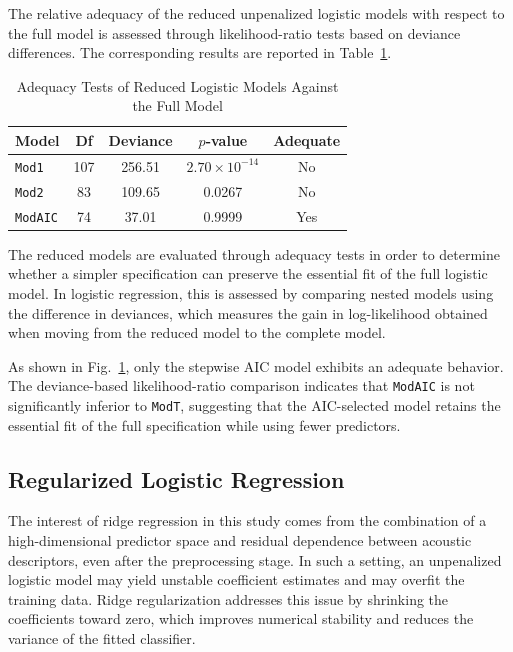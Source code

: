 The relative adequacy of the reduced unpenalized logistic models with respect to the full model is assessed through likelihood-ratio tests based on deviance differences. The corresponding results are reported in Table~\ref{tab:binary_adequacy_tests}.

\begin{table}[!t]
\caption{Adequacy Tests of Reduced Logistic Models Against the Full Model}
\label{tab:binary_adequacy_tests}
\centering
\footnotesize
\begin{tabular}{lcccc}
\hline
Model & Df & Deviance & \(p\)-value & Adequate \\
\hline
\texttt{Mod1} & 107 & 256.51 & \(2.70 \times 10^{-14}\) & No \\
\texttt{Mod2} & 83 & 109.65 & 0.0267 & No \\
\texttt{ModAIC} & 74 & 37.01 & 0.9999 & Yes \\
\hline
\end{tabular}
\end{table}

The reduced models are evaluated through adequacy tests in order to determine whether a simpler specification can preserve the essential fit of the full logistic model. In logistic regression, this is assessed by comparing nested models using the difference in deviances, which measures the gain in log-likelihood obtained when moving from the reduced model to the complete model.

As shown in Fig.~\ref{tab:binary_adequacy_tests}, only the stepwise AIC model exhibits an adequate behavior. The deviance-based likelihood-ratio comparison indicates that \texttt{ModAIC} is not significantly inferior to \texttt{ModT}, suggesting that the AIC-selected model retains the essential fit of the full specification while using fewer predictors.

\subsection{Regularized Logistic Regression}

The interest of ridge regression in this study comes from the combination of a high-dimensional predictor space and residual dependence between acoustic descriptors, even after the preprocessing stage. In such a setting, an unpenalized logistic model may yield unstable coefficient estimates and may overfit the training data. Ridge regularization addresses this issue by shrinking the coefficients toward zero, which improves numerical stability and reduces the variance of the fitted classifier.

